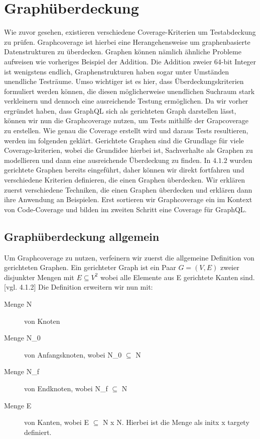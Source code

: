 \chapter{Graphüberdeckung}

Wie zuvor gesehen, existieren verschiedene Coverage-Kriterien um Testabdeckung zu prüfen.
Graphcoverage ist hierbei eine Herangehensweise um graphenbasierte Datenstrukturen zu überdecken.
Graphen können nämlich ähnliche Probleme aufweisen wie vorheriges Beispiel der Addition.
Die Addition zweier 64-bit Integer ist wenigstens endlich, Graphenstrukturen haben sogar unter Umständen unendliche Testräume.
Umso wichtiger ist es hier, dass Überdeckungskriterien formuliert werden können, die diesen möglicherweise unendlichen Suchraum
stark verkleinern und dennoch eine ausreichende Testung ermöglichen.
Da wir vorher ergründet haben, dass GraphQL sich als gerichteten Graph darstellen lässt, können wir nun die Graphcoverage nutzen, um Tests mithilfe der Grapcoverage zu erstellen.
Wie genau die Coverage erstellt wird und daraus Tests resultieren, werden im folgenden geklärt.
Gerichtete Graphen sind die Grundlage für viele Coverage-kriterien, wobei die Grundidee hierbei ist,
Sachverhalte als Graphen zu modellieren und dann eine ausreichende Überdeckung zu finden. \cite[vgl. Software-testing S. 27 2.1]{software-testing}
In $4.1.2$ wurden gerichtete Graphen bereits eingeführt, daher können wir direkt fortfahren und verschiedene
Kriterien definieren, die einen Graphen überdecken.
Wir erklären zuerst verschiedene Techniken, die einen Graphen überdecken und erklären dann ihre Anwendung
an Beispielen.
Erst sortieren wir Graphcoverage ein im Kontext von Code-Coverage und bilden im zweiten Schritt eine Coverage für GraphQL\@.

\section{Graphüberdeckung allgemein}

Um Graphcoverage zu nutzen, verfeinern wir zuerst die allgemeine Definition von gerichteten Graphen.
Ein gerichteter Graph ist ein Paar $G = (V, E)$ zweier disjunkter Mengen mit $E \subseteq V^2$ wobei alle Elemente aus E gerichtete Kanten sind. [vgl. 4.1.2]
Die Definition erweitern wir nun mit:

\begin{description}
    \item[Menge N] von Knoten
    \item[Menge N_{0}] von Anfangsknoten, wobei N_{0} $\subseteq$ N
    \item[Menge N_{f}] von Endknoten, wobei N_{f} $\subseteq$ N
    \item[Menge E] von Kanten, wobei E $\subseteq$ N x N. Hierbei ist die Menge als init{x} x target{y} definiert.
\end{description}~\cite[2.1 Overview]{software-testing}

